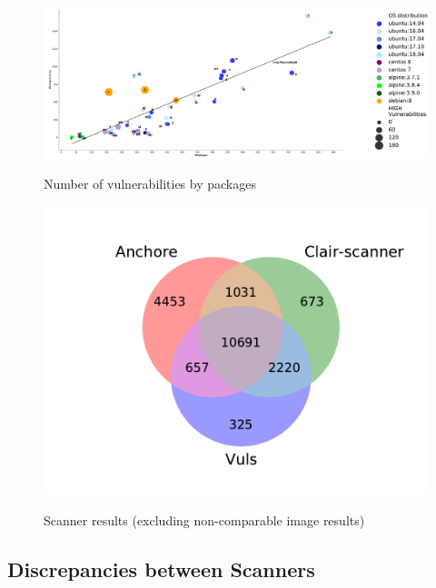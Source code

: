 \documentclass[a4paper,num-refs]{oup-contemporary}
\begin{document}
\begin{figure}[!ht]
        {\includegraphics[scale=1.5,width=\textwidth]
        {Figures/vulngraph.pdf}}
	\vspace*{-7mm}
        \caption{\label{fig:graph1} Number of vulnerabilities by packages}
      \end{figure}

\begin{figure}[!ht]
        {\includegraphics[scale=2.5,width=\columnwidth]
        {Figures/venn.pdf}}
	\vspace*{-10mm}
	\caption{\label{fig:venn} Scanner results (excluding non-comparable image results)}
\end{figure}

\subsection{Discrepancies between Scanners}
\end{document}
